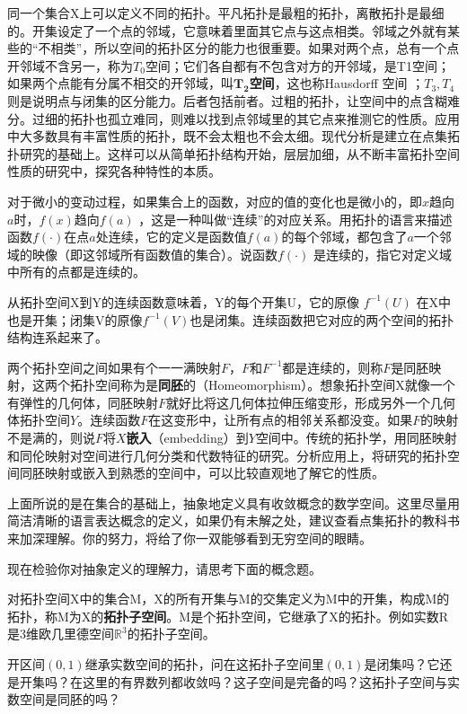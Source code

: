 同一个集合X上可以定义不同的拓扑。平凡拓扑是最粗的拓扑，离散拓扑是最细的。开集设定了一个点的邻域，它意味着里面其它点与这点相类。邻域之外就有某些的``不相类''，所以空间的拓扑区分的能力也很重要。如果对两个点，总有一个点开邻域不含另一，称为$ T_0 $空间；它们各自都有不包含对方的开邻域，是T1空间；如果两个点能有分属不相交的开邻域，叫$\mathbf{T_2}$\textbf{空间}，这也称Hausdorff 空间 ；$ T_3, T_4 $则是说明点与闭集的区分能力。后者包括前者。过粗的拓扑，让空间中的点含糊难分。过细的拓扑也孤立难同，则难以找到点邻域里的其它点来推测它的性质。应用中大多数具有丰富性质的拓扑，既不会太粗也不会太细。现代分析是建立在点集拓扑研究的基础上。这样可以从简单拓扑结构开始，层层加细，从不断丰富拓扑空间性质的研究中，探究各种特性的本质。

对于微小的变动过程，如果集合上的函数，对应的值的变化也是微小的，即$ x $趋向$ a $时，$ f(x) $趋向$ f(a) $ ，这是一种叫做``连续''的对应关系。用拓扑的语言来描述函数$ f(\cdot) $在点$ a $处连续，它的定义是函数值$ f(a) $的每个邻域，都包含了$ a $一个邻域的映像（即这邻域所有函数值的集合）。说函数$ f(\cdot) $ 是连续的，指它对定义域中所有的点都是连续的。

从拓扑空间X到Y的连续函数意味着，Y的每个开集U，它的原像 $ f^{-1}(U) $ 在X中也是开集；闭集V的原像$ f^{-1}(V) $也是闭集。连续函数把它对应的两个空间的拓扑结构连系起来了。

两个拓扑空间之间如果有个一一满映射$ F $，$ F $和$ F^{-1} $都是连续的，则称$ F $是同胚映射，这两个拓扑空间称为是\textbf{同胚}的（Homeomorphism）。想象拓扑空间X就像一个有弹性的几何体，同胚映射$ F $就好比将这几何体拉伸压缩变形，形成另外一个几何体拓扑空间$ Y $。连续函数$ F $在这变形中，让所有点的相邻关系都没变。如果$ F $的映射不是满的，则说$ F $将$ X $\textbf{嵌入}（embedding）到$ Y $空间中。传统的拓扑学，用同胚映射和同伦映射对空间进行几何分类和代数特征的研究。分析应用上，将研究的拓扑空间同胚映射或嵌入到熟悉的空间中，可以比较直观地了解它的性质。

上面所说的是在集合的基础上，抽象地定义具有收敛概念的数学空间。这里尽量用简洁清晰的语言表达概念的定义，如果仍有未解之处，建议查看点集拓扑的教科书来加深理解。你的努力，将给了你一双能够看到无穷空间的眼睛。

现在检验你对抽象定义的理解力，请思考下面的概念题。

对拓扑空间X中的集合M，X的所有开集与M的交集定义为M中的开集，构成M的拓扑，称M为X的\textbf{拓扑子空间}。M是个拓扑空间，它继承了X的拓扑。例如实数R是3维欧几里德空间$ \mathbb{R}^3 $的拓扑子空间。

开区间$ (0, 1) $继承实数空间的拓扑，问在这拓扑子空间里$ (0, 1) $是闭集吗？它还是开集吗？在这里的有界数列都收敛吗？这子空间是完备的吗？这拓扑子空间与实数空间是同胚的吗？

